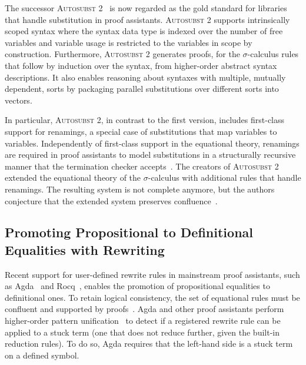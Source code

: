 \documentclass[a4paper,UKenglish,cleveref, autoref, thm-restate,anonymous]{lipics-v2021}
\begin{document}
The successor \textsc{Autosubst 2}~\cite{10.1145/3293880.3294101} is now
regarded as the gold standard for libraries that handle substitution in proof
assistants. \textsc{Autosubst 2} supports intrinsically scoped syntax where the
syntax data type is indexed over the number of free variables and variable
usage is restricted to the variables in scope by construction. Furthermore,
\textsc{Autosubst 2} generates proofs, for the $σ$-calculus rules that follow
by induction over the syntax, from higher-order abstract syntax descriptions.
It also enables reasoning about syntaxes with multiple, mutually dependent,
sorts by packaging parallel substitutions over different sorts into vectors.

In particular, \textsc{Autosubst 2}, in contrast to the first version, includes
first-class support for renamings, a special case of substitutions that map
variables to variables. Independently of first-class support in the equational
theory, renamings are required in proof assistants to model substitutions in a
structurally recursive manner that the termination checker
accepts~\cite{10.1007/11617990_1}. The creators of \textsc{Autosubst 2}
extended the equational theory of the $σ$-calculus with additional rules that
handle renamings. The resulting system is not complete anymore, but the authors
conjecture that the extended system preserves
confluence~\cite{Stark:2020:Mechanising}.

\subsection{Promoting Propositional to Definitional Equalities with Rewriting}

Recent support for user-defined rewrite rules in mainstream proof assistants,
such as Agda~\cite{cockx:LIPIcs.TYPES.2019.2, 10.1145/3434341} and
Rocq~\cite{leray_et_al:LIPIcs.ITP.2024.26}, enables the promotion of
propositional equalities to definitional ones. To retain logical consistency,
the set of equational rules must be confluent and supported by
proofs~\cite{10.1145/3434341}. Agda and other proof assistants perform
higher-order pattern unification~\cite{10.1007/978-3-642-21691-6_5} to detect
if a registered rewrite rule can be applied to a stuck term (one that does not
reduce further, given the built-in reduction rules). To do so, Agda requires
that the left-hand side is a stuck term on a defined symbol.
\end{document}

